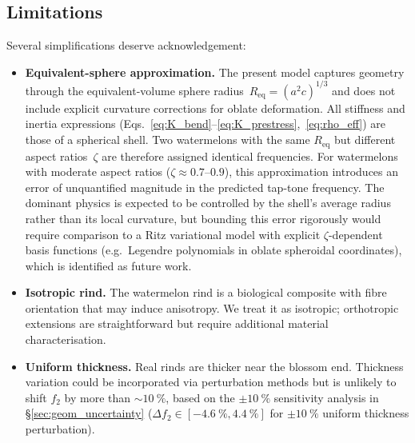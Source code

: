 \subsection{Limitations}
\label{sec:limitations}

Several simplifications deserve acknowledgement:

\begin{itemize}
  \item \textbf{Equivalent-sphere approximation.}  The present model
    captures geometry through the equivalent-volume sphere
    radius~$R_{\mathrm{eq}} = (a^2 c)^{1/3}$ and does not include
    explicit curvature corrections for oblate deformation.  All
    stiffness and inertia expressions
    (Eqs.~\ref{eq:K_bend}--\ref{eq:K_prestress},~\ref{eq:rho_eff})
    are those of a spherical shell.  Two watermelons with the same
    $R_{\mathrm{eq}}$ but different aspect ratios~$\zeta$ are therefore
    assigned identical frequencies.  For watermelons with moderate
    aspect ratios ($\zeta \approx 0.7$--$0.9$), this approximation
    introduces an error of unquantified magnitude in the predicted
    tap-tone frequency.  The dominant physics is expected to be
    controlled by the shell's average radius rather than its local
    curvature, but bounding this error rigorously would require
    comparison to a Ritz variational model
    with explicit $\zeta$-dependent basis functions (e.g.\ Legendre
    polynomials in oblate spheroidal coordinates), which is identified
    as future work.

  \item \textbf{Isotropic rind.}  The watermelon rind is a biological
    composite with fibre orientation that may induce anisotropy.  We
    treat it as isotropic; orthotropic extensions are straightforward
    but require additional material characterisation.

  \item \textbf{Uniform thickness.}  Real rinds are thicker near the
    blossom end.  Thickness variation could be incorporated via
    perturbation methods but is unlikely to shift $f_2$ by more than
    $\sim\SI{10}{\percent}$, based on the $\pm\SI{10}{\percent}$
    sensitivity analysis in \S\ref{sec:geom_uncertainty}
    ($\Delta f_2 \in [\SI{-4.6}{\percent}, \SI{+4.4}{\percent}]$ for
    $\pm\SI{10}{\percent}$ uniform thickness perturbation).


\end{itemize}
